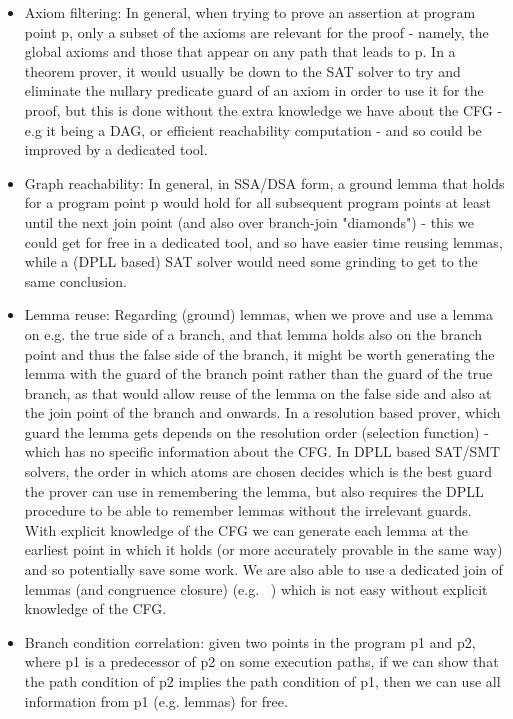 \begin{itemize}
	\item Axiom filtering: In general, when trying to prove an assertion at program point p, only a subset of the axioms are relevant for the proof - namely, the global axioms and those that appear on any path that leads to p.
	In a theorem prover, it would usually be down to the SAT solver to try and eliminate the nullary predicate guard of an axiom in order to use it for the proof, but this is done without the extra knowledge we have about the CFG - e.g it being a DAG, or efficient reachability computation - and so could be improved by a dedicated tool.
	\item Graph reachability: In general, in SSA/DSA form, a ground lemma that holds for a program point p would hold for all subsequent program points at least until the next join point (and also over branch-join "diamonds") - this we could get for free in a dedicated tool, and so have easier time reusing lemmas, while a (DPLL based) SAT solver would need some grinding to get to the same conclusion.
	\item Lemma reuse: Regarding (ground) lemmas, when we prove and use a lemma on e.g. the true side of a branch, and that lemma holds also on the branch point and thus the false side of the branch, it might be worth generating the lemma with the guard of the branch point rather than the guard of the true branch, as that would allow reuse of the lemma on the false side and also at the join point of the branch and onwards.
	In a resolution based prover, which guard the lemma gets depends on the resolution order (selection function) - which has no specific information about the CFG. In DPLL based SAT/SMT solvers, the order in which atoms are chosen decides which is the best guard the prover can use in remembering the lemma, but also requires the DPLL procedure to be able to remember lemmas without the irrelevant guards.
	With explicit knowledge of the CFG we can generate each lemma at the earliest point in which it holds (or more accurately provable in the same way) and so potentially save some work.
	We are also able to use a dedicated join of lemmas (and congruence closure) (e.g. ~\cite{DBLP:conf/fsttcs/GulwaniTN04}) which is not easy without explicit knowledge of the CFG.
	\item Branch condition correlation: given two points in the program p1 and p2, where p1 is a predecessor of p2 on some execution paths, if we can show that the path condition of p2 implies the path condition of p1, then we can use all information from p1 (e.g. lemmas) for free.

\end{itemize}

